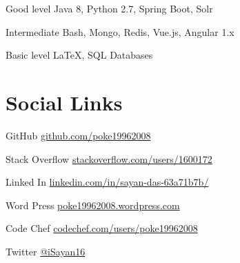 \documentclass{tccv}
\begin{document}
\begin{factlist}
	
	\item{Good level}
	{Java 8, Python 2.7, Spring Boot, Solr }
	
	\item{Intermediate}
	{Bash, Mongo, Redis, Vue.js, Angular 1.x}
	
	\item{Basic level}
	{\LaTeX, SQL Databases}
	
\end{factlist}

\section{Social Links}

\begin{factlist}
	
	\item{GitHub}
	{\href{https://github.com/poke19962008}{github.com/poke19962008}}
	\item{Stack Overflow}
	{\href{https://stackoverflow.com/users/1600172}{stackoverflow.com/users/1600172}}
	\item{Linked In}
	{\href{https://www.linkedin.com/in/sayan-das-63a71b7b/}{linkedin.com/in/sayan-das-63a71b7b/}}
	\item{Word Press}
	{\href{https://poke19962008.wordpress.com}{poke19962008.wordpress.com}}
	\item{Code Chef}
	{\href{https://www.codechef.com/users/poke19962008}{codechef.com/users/poke19962008}}
	\item{Twitter}
	{\href{https://twitter.com/iSayan16}{@iSayan16}}
	     
	
\end{factlist}
\end{document}
